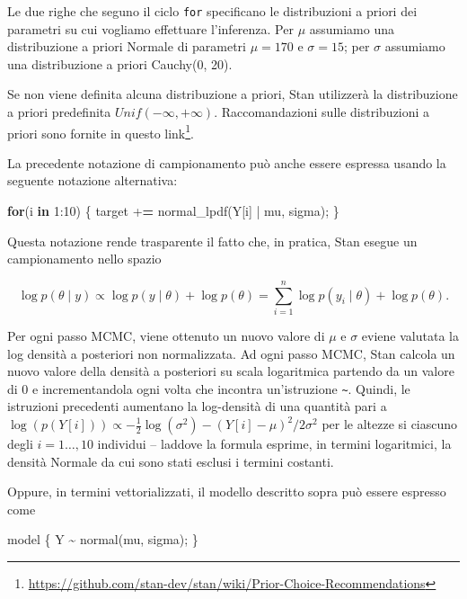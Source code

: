 \documentclass[
  11pt,
]{krantz}
\makeatletter
\newenvironment{Shaded}{\begin{snugshade}}{\end{snugshade}}
\newcommand{\ControlFlowTok}[1]{\textcolor[rgb]{0.27,0.27,0.27}{\textbf{#1}}}
\newcommand{\DecValTok}[1]{\textcolor[rgb]{0.06,0.06,0.06}{#1}}
\newcommand{\ErrorTok}[1]{\textcolor[rgb]{0.14,0.14,0.14}{\textbf{#1}}}
\newcommand{\FunctionTok}[1]{\textcolor[rgb]{0,0,0}{#1}}
\newcommand{\NormalTok}[1]{#1}
\newcommand{\SpecialCharTok}[1]{\textcolor[rgb]{0,0,0}{#1}}
\renewcommand{\href}[2]{#2\footnote{\url{#1}}}
\newenvironment{kframe}{%
\medskip{}
\setlength{\fboxsep}{.8em}
 \def\at@end@of@kframe{}%
 \ifinner\ifhmode%
  \def\at@end@of@kframe{\end{minipage}}%
  \begin{minipage}{\columnwidth}%
 \fi\fi%
 \def\FrameCommand##1{\hskip\@totalleftmargin \hskip-\fboxsep
 \colorbox{shadecolor}{##1}\hskip-\fboxsep
     \hskip-\linewidth \hskip-\@totalleftmargin \hskip\columnwidth}%
 \MakeFramed {\advance\hsize-\width
   \@totalleftmargin\z@ \linewidth\hsize
   \@setminipage}}%
 {\par\unskip\endMakeFramed%
 \at@end@of@kframe}
\renewenvironment{Shaded}{\begin{kframe}}{\end{kframe}}
\theoremstyle{definition}
\theoremstyle{definition}
\theoremstyle{definition}
\theoremstyle{definition}
\theoremstyle{remark}
\makeatother
\begin{document}
Le due righe che seguno il ciclo \texttt{for} specificano le distribuzioni a priori dei parametri su cui vogliamo effettuare l'inferenza. Per \(\mu\) assumiamo una distribuzione a priori Normale di parametri \(\mu = 170\) e \(\sigma = 15\); per \(\sigma\) assumiamo una distribuzione a priori Cauchy(0, 20).

Se non viene definita alcuna distribuzione a priori, Stan utilizzerà la distribuzione a priori predefinita \(Unif(-\infty, +\infty)\). Raccomandazioni sulle distribuzioni a priori sono fornite in questo \href{https://github.com/stan-dev/stan/wiki/Prior-Choice-Recommendations}{link}.

La precedente notazione di campionamento può anche essere espressa usando la seguente notazione alternativa:

\begin{Shaded}
\begin{Highlighting}[]
  \ControlFlowTok{for}\NormalTok{(i }\ControlFlowTok{in} \DecValTok{1}\SpecialCharTok{:}\DecValTok{10}\NormalTok{) \{}
\NormalTok{    target }\SpecialCharTok{+}\ErrorTok{=} \FunctionTok{normal\_lpdf}\NormalTok{(Y[i] }\SpecialCharTok{|}\NormalTok{ mu, sigma);}
\NormalTok{  \}}
\end{Highlighting}
\end{Shaded}

Questa notazione rende trasparente il fatto che, in pratica, Stan esegue un campionamento nello spazio

\[
\log p(\theta \mid y) \propto \log p(y \mid \theta) + \log p(\theta) = \sum_{i=1}^n \log p(y_i \mid \theta) + \log p(\theta).
\]

Per ogni passo MCMC, viene ottenuto un nuovo valore di \(\mu\) e \(\sigma\) eviene valutata la log densità a posteriori non normalizzata. Ad ogni passo MCMC, Stan calcola un nuovo valore della densità a posteriori su scala logaritmica partendo da un valore di 0 e incrementandola ogni volta che incontra un'istruzione \texttt{\textasciitilde{}}. Quindi, le istruzioni precedenti aumentano la log-densità di una quantità pari a \(\log (p(Y[i])) \propto -\frac{1}{2} \log(\sigma^2) - (Y[i]-\mu)^2 / 2\sigma^2\) per le altezze si ciascuno degli \(i=1 \dots, 10\) individui -- laddove la formula esprime, in termini logaritmici, la densità Normale da cui sono stati esclusi i termini costanti.

Oppure, in termini vettorializzati, il modello descritto sopra può essere espresso come

\begin{Shaded}
\begin{Highlighting}[]
\NormalTok{model \{}
\NormalTok{  Y }\SpecialCharTok{\textasciitilde{}} \FunctionTok{normal}\NormalTok{(mu, sigma);}
\NormalTok{\}}
\end{Highlighting}
\end{Shaded}
\end{document}
